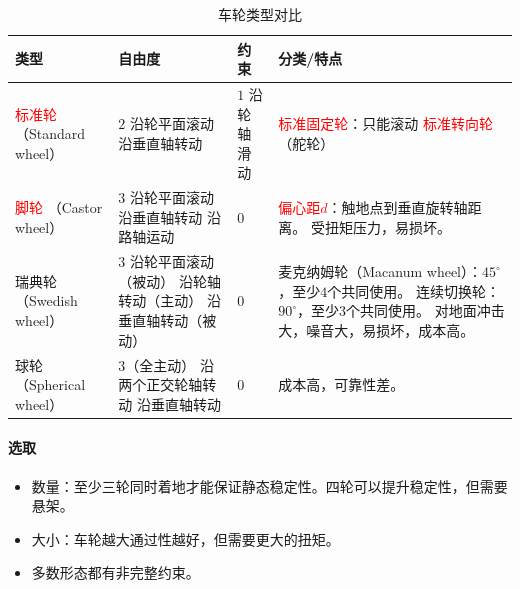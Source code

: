 \documentclass[
12pt, %
a4paper, 
oneside, %
]{scrartcl}
\begin{document}
\begin{table}[H]
\centering
\begin{tabular}{|p{2cm}|p{4.2cm}|p{2.2cm}|p{7cm}|}
\hline
类型 & 自由度 & 约束 & 分类/特点 \\
\hline
\textcolor{red}{标准轮} \newline （Standard wheel） & $ 2 $ \newline 沿轮平面滚动 \newline 沿垂直轴转动 & $ 1 $ \newline 沿轮轴滑动 & \textcolor{red}{标准固定轮}：只能滚动 \newline \textcolor{red}{标准转向轮}（舵轮） \\
\hline
\textcolor{red}{脚轮} \newline （Castor wheel） & $ 3 $ \newline 沿轮平面滚动 \newline 沿垂直轴转动 \newline 沿路轴运动 & $ 0 $ & \textcolor{red}{偏心距$ d $}：触地点到垂直旋转轴距离。 \newline 受扭矩压力，易损坏。 \\
\hline
瑞典轮 \newline （Swedish wheel） & $ 3 $ \newline 沿轮平面滚动（被动） \newline 沿轮轴转动（主动） \newline 沿垂直轴转动（被动） & $ 0 $ & 麦克纳姆轮（Macanum wheel）：$ 45^\circ $，至少$ 4 $个共同使用。 \newline 连续切换轮：$ 90^\circ $，至少$ 3 $个共同使用。 \newline 对地面冲击大，噪音大，易损坏，成本高。 \\
\hline
球轮 \newline （Spherical wheel） & $ 3 $（全主动） \newline 沿两个正交轮轴转动 \newline 沿垂直轴转动 & $ 0 $ & 成本高，可靠性差。 \\
\hline
\end{tabular}
\caption{车轮类型对比}
\end{table}
\paragraph{选取}
\begin{itemize}
\item 数量：至少三轮同时着地才能保证静态稳定性。四轮可以提升稳定性，但需要悬架。
\item 大小：车轮越大通过性越好，但需要更大的扭矩。
\item 多数形态都有非完整约束。
\end{itemize}
\end{document}
